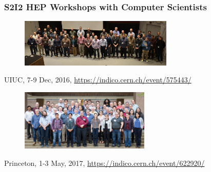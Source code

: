 \begin{frame}
\frametitle{S2I2 HEP Workshops with Computer Scientists}

\begin{figure}[htbp]
\begin{center}
\includegraphics[width=0.65\textwidth]{images/20161208-S2I2-HEP-CS-UIUC-group-photo.jpeg}
\end{center}
\end{figure}

\small{UIUC, 7-9 Dec, 2016, \url{https://indico.cern.ch/event/575443/}}

\begin{figure}[htbp]
\begin{center}
\includegraphics[width=0.55\textwidth]{images/20170502-S2I2-HEP-CS-Princeton-group-photo.jpeg}
\end{center}
\end{figure}

\small{Princeton, 1-3 May, 2017, \url{https://indico.cern.ch/event/622920/}}


\end{frame}


